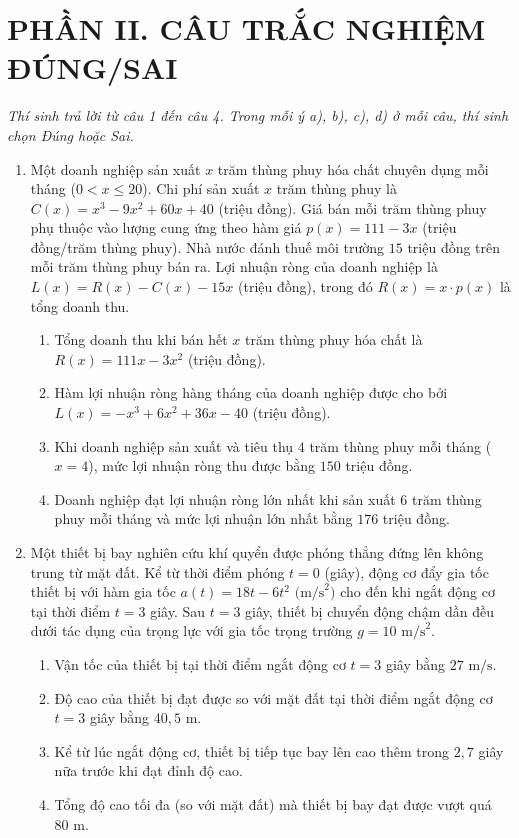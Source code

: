 \documentclass[12pt,a4paper]{article}
\begin{document}
\section*{PHẦN II. CÂU TRẮC NGHIỆM ĐÚNG/SAI}
\textit{Thí sinh trả lời từ câu 1 đến câu 4. Trong mỗi ý a), b), c), d) ở mỗi câu, thí sinh chọn Đúng hoặc Sai.}

\begin{enumerate}[label=\textbf{Câu \arabic*:}, leftmargin=*]

\item Một doanh nghiệp sản xuất $x$ trăm thùng phuy hóa chất chuyên dụng mỗi tháng ($0 < x \le 20$). Chi phí sản xuất $x$ trăm thùng phuy là $C(x) = x^3 - 9x^2 + 60x + 40$ (triệu đồng). Giá bán mỗi trăm thùng phuy phụ thuộc vào lượng cung ứng theo hàm giá $p(x) = 111 - 3x$ (triệu đồng/trăm thùng phuy). Nhà nước đánh thuế môi trường $15$ triệu đồng trên mỗi trăm thùng phuy bán ra. Lợi nhuận ròng của doanh nghiệp là $L(x) = R(x) - C(x) - 15x$ (triệu đồng), trong đó $R(x) = x \cdot p(x)$ là tổng doanh thu.
\begin{enumerate}[label=\alph*)]
    \item Tổng doanh thu khi bán hết $x$ trăm thùng phuy hóa chất là $R(x) = 111x - 3x^2$ (triệu đồng).
    \item Hàm lợi nhuận ròng hàng tháng của doanh nghiệp được cho bởi $L(x) = -x^3 + 6x^2 + 36x - 40$ (triệu đồng).
    \item Khi doanh nghiệp sản xuất và tiêu thụ $4$ trăm thùng phuy mỗi tháng ($x = 4$), mức lợi nhuận ròng thu được bằng $150$ triệu đồng.
    \item Doanh nghiệp đạt lợi nhuận ròng lớn nhất khi sản xuất $6$ trăm thùng phuy mỗi tháng và mức lợi nhuận lớn nhất bằng $176$ triệu đồng.
\end{enumerate}

\item Một thiết bị bay nghiên cứu khí quyển được phóng thẳng đứng lên không trung từ mặt đất. Kể từ thời điểm phóng $t = 0$ (giây), động cơ đẩy gia tốc thiết bị với hàm gia tốc $a(t) = 18t - 6t^2\text{ (m/s}^2\text{)}$ cho đến khi ngắt động cơ tại thời điểm $t = 3$ giây. Sau $t = 3$ giây, thiết bị chuyển động chậm dần đều dưới tác dụng của trọng lực với gia tốc trọng trường $g = 10\text{ m/s}^2$.
\begin{enumerate}[label=\alph*)]
    \item Vận tốc của thiết bị tại thời điểm ngắt động cơ $t = 3$ giây bằng $27\text{ m/s}$.
    \item Độ cao của thiết bị đạt được so với mặt đất tại thời điểm ngắt động cơ $t = 3$ giây bằng $40{,}5\text{ m}$.
    \item Kể từ lúc ngắt động cơ, thiết bị tiếp tục bay lên cao thêm trong $2{,}7$ giây nữa trước khi đạt đỉnh độ cao.
    \item Tổng độ cao tối đa (so với mặt đất) mà thiết bị bay đạt được vượt quá $80\text{ m}$.
\end{enumerate}


\end{enumerate}
\end{document}
